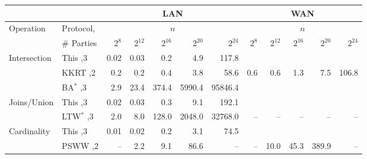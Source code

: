 





\begin{figure*}[t!]\centering\footnotesize\label{fig:compare}
\begin{tabular}{|l |l|| r | r |r |r|r||r | r |r |r|r|}
	\cline{3-12}
	\multicolumn{1}{c}{}          & \multicolumn{1}{c}{}                           & \multicolumn{5}{|c||}{LAN}                        & \multicolumn{5}{|c|}{WAN}                         \\ \hline
	\multirow{2}{*}{Operation}    & \multirow{1}{*}{Protocol,}                     &             \multicolumn{5}{c||}{$n$}             &             \multicolumn{5}{c|}{$n$}              \\
	                              & \# Parties                                     & $2^8$ & $2^{12}$ & $2^{16}$ & $2^{20}$ & $2^{24}$ & $2^8$ & $2^{12}$ & $2^{16}$ & $2^{20}$ & $2^{24}$ \\ \hline\hline
	\multirow{3}{*}{Intersection} & This                         \hfill ,3         & 0.02  & 0.03     & 0.2      & 4.9      &    117.8 &       &          &          &          &          \\ \cline{2-12}
	                              & KKRT                     \hfill ,2             & 0.2   & 0.2      & 0.4      & 3.8      &     58.6 &   0.6 & 0.6      & 1.3      & 7.5      &    106.8 \\ \cline{2-12}
	                              & BA$^*$                      \hfill ,3          & 2.9   & 23.4     & 374.4    & 5990.4   &  95846.4 &       &          &          &          &          \\ \hline\hline
	\multirow{2}{*}{Joins/Union}  & This                        \hfill ,3          & 0.02  & 0.03     & 0.3      & 9.1      &    192.1 &       &          &          &          &          \\ \cline{2-12}
	                              & LTW$^*$                      \hfill ,3         & 2.0   & 8.0      & 128.0    & 2048.0   &  32768.0 &    -- & --       & --       & --       &       -- \\ \hline\hline
	\multirow{3}{*}{Cardinality}  & This                          \hfill ,3        & 0.01  & 0.02     & 0.2      & 3.1      &     74.5 &       &          &          &          &          \\ \cline{2-12}
	                              & PSWW                           \hfill ,2       & --    & 2.2      & 9.1      & 86.6     &       -- &    -- & 10.0     & 45.3     & 389.9    &       -- \\ \cline{2-12}

\end{tabular}
\end{figure*}
